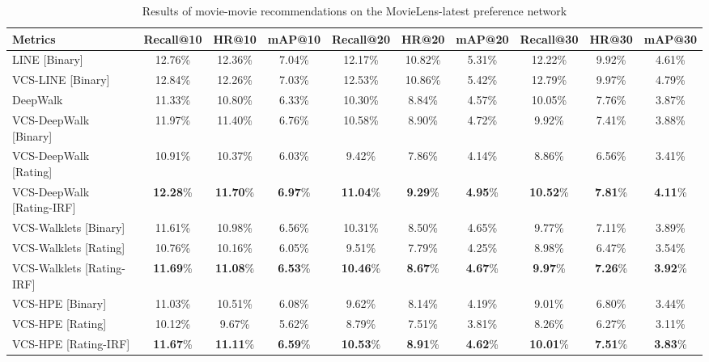 {

\begin{table*}%
\centering
\begin{tabular}{lccccccccc}
\toprule
Metrics                        & {\small Recall@10} & {\small HR@10} & {\small mAP@10} & {\small Recall@20} & {\small HR@20} & {\small mAP@20} & {\small Recall@30} & {\small HR@30} & {\small mAP@30} \\
\midrule
LINE \cite{line} [Binary]   & 12.76\% & 12.36\% & 7.04\% & 12.17\% & 10.82\% & 5.31\% & 12.22\% & 9.92\% & 4.61\%  \\
VCS-LINE [Binary]           & 12.84\% & 12.26\% & 7.03\% & 12.53\% & 10.86\% & 5.42\% & 12.79\% & 9.97\% & 4.79\%  \\
\midrule
DeepWalk \cite{dw}          & 11.33\% & 10.80\% & 6.33\% & 10.30\% & 8.84\% & 4.57\% & 10.05\% & 7.76\% & 3.87\%  \\
VCS-DeepWalk [Binary]       & 11.97\% & 11.40\% & 6.76\% & 10.58\% & 8.90\% & 4.72\% & 9.92\% & 7.41\% & 3.88\% \\
VCS-DeepWalk [Rating]       & 10.91\% & 10.37\% & 6.03\% & 9.42\% & 7.86\% & 4.14\% & 8.86\% & 6.56\% & 3.41\% \\
VCS-DeepWalk [Rating-IRF]   & \textbf{12.28}\% & \textbf{11.70}\% & \textbf{6.97}\% & \textbf{11.04}\% & \textbf{9.29}\% & \textbf{4.95}\% & \textbf{10.52}\% & \textbf{7.81}\% & \textbf{4.11}\% \\
\midrule
VCS-Walklets [Binary]       & 11.61\% & 10.98\% & 6.56\% & 10.31\% & 8.50\% & 4.65\% & 9.77\% & 7.11\% & 3.89\% \\
VCS-Walklets [Rating]       & 10.76\% & 10.16\% & 6.05\% & 9.51\% & 7.79\% & 4.25\% & 8.98\% & 6.47\% & 3.54\% \\
VCS-Walklets [Rating-IRF]   & \textbf{11.69}\% & \textbf{11.08}\% & \textbf{6.53}\% & \textbf{10.46}\% & \textbf{8.67}\% & \textbf{4.67}\% & \textbf{9.97}\% & \textbf{7.26}\% & \textbf{3.92}\% \\
\midrule
VCS-HPE [Binary]        & 11.03\% & 10.51\% & 6.08\% & 9.62\% & 8.14\% & 4.19\% & 9.01\% & 6.80\% & 3.44\% \\
VCS-HPE [Rating]        & 10.12\% & 9.67\% & 5.62\% & 8.79\% & 7.51\% & 3.81\% & 8.26\% & 6.27\% & 3.11\% \\
VCS-HPE [Rating-IRF]    & \textbf{11.67}\% & \textbf{11.11}\% & \textbf{6.59}\% & \textbf{10.53}\% & \textbf{8.91}\% & \textbf{4.62}\% & \textbf{10.01}\% & \textbf{7.51}\% & \textbf{3.83}\% \\
\bottomrule
\end{tabular}
\caption{Results of movie-movie recommendations on the MovieLens-latest preference network}
\label{tb:ml-latest_rec}
\end{table*}%
}


